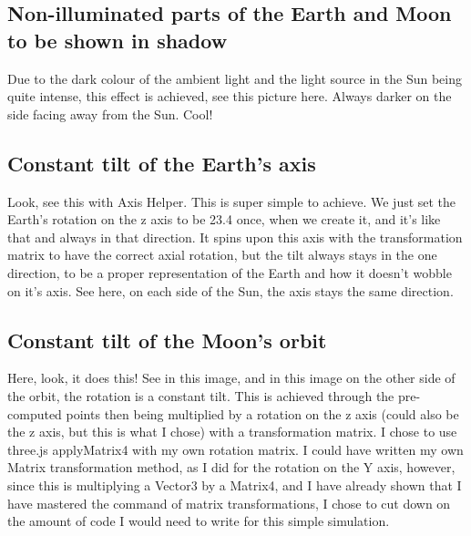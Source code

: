 \documentclass[12pt]{article}
\begin{document}
\subsection{Non-illuminated parts of the Earth and Moon to be shown in shadow}
Due to the dark colour of the ambient light and the light source in the Sun being quite intense, this effect is achieved, see this picture here. Always darker on the side facing away from the Sun. Cool!

\subsection{Constant tilt of the Earth's axis}
Look, see this with Axis Helper. This is super simple to achieve. We just set the Earth's rotation on the z axis to be 23.4 once, when we create it, and it's like that and always in that direction. It spins upon this axis with the transformation matrix to have the correct axial rotation, but the tilt always stays in the one direction, to be a proper representation of the Earth and how it doesn't wobble on it's axis. See here, on each side of the Sun, the axis stays the same direction.

\subsection{Constant tilt of the Moon's orbit}
Here, look, it does this! See in this image, and in this image on the other side of the orbit, the rotation is a constant tilt. This is achieved through the pre-computed points then being multiplied by a rotation on the z axis (could also be the z axis, but this is what I chose) with a transformation matrix. I chose to use three.js applyMatrix4 with my own rotation matrix. I could have written my own Matrix transformation method, as I did for the rotation on the Y axis, however, since this is multiplying a Vector3 by a Matrix4, and I have already shown that I have mastered the command of matrix transformations, I chose to cut down on the amount of code I would need to write for this simple simulation.
\end{document}
